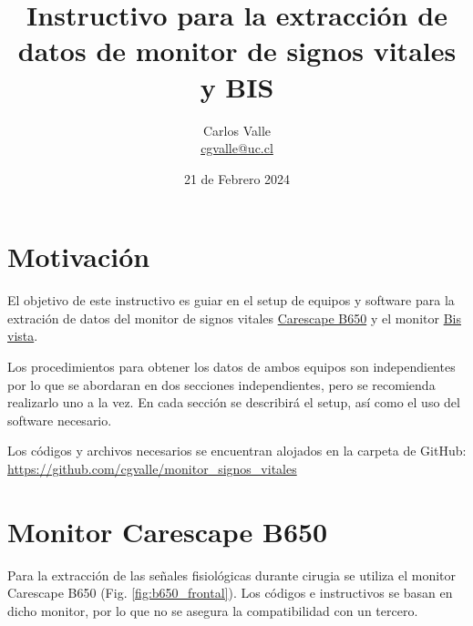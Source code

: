 \documentclass{article}
\begin{document}
\title{\huge \textbf{Instructivo para la extracción de datos de monitor de signos vitales y BIS } \vspace{8cm}}
\author{Carlos Valle \\ \href{mailto:cgvalle@uc.cl}{cgvalle@uc.cl} }
\date{21 de Febrero 2024}
\maketitle


\newpage

\section{Motivación}

El objetivo de este instructivo es guiar en el setup de equipos y software para la extración de datos del monitor de signos vitales \href{https://www.gehealthcare.com/products/patient-monitoring/patient-monitors/carescape-monitor-b650}{Carescape B650} y el monitor \href{https://www.medtronic.com/covidien/es-cl/products/brain-monitoring/bis-complete-4-channel-monitor.html}{Bis vista}.

Los procedimientos para obtener los datos de ambos equipos son independientes por lo que se abordaran en dos secciones independientes, pero se recomienda realizarlo uno a la vez. En cada sección se describirá el setup, así como el uso del software necesario. 

Los códigos y archivos necesarios se encuentran alojados en la carpeta de GitHub: \url{https://github.com/cgvalle/monitor_signos_vitales} 



\newpage



\section{Monitor Carescape B650}
Para la extracción de las señales fisiológicas durante cirugia se utiliza el monitor Carescape B650 (Fig. \ref{fig:b650_frontal}). Los códigos e instructivos se basan en dicho monitor, por lo que no se asegura la compatibilidad con un tercero. 
\end{document}
